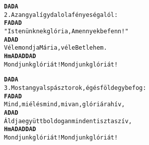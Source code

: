 \newpage
{}
\kottastart
{}
\kottaend
\begin{minipage}{\textwidth}
\begin{alltt}
\textbf{      D             A     D          A}
2. Az angyal így dalol a fényes ég alól:
\textbf{    F    A        D            A           D}
   "Istenünknek glória, A mennyekbe fenn!"
\textbf{    A           D              A    D}
   Véle mondja Mária, véle Betlehem.
\textbf{    Hm        A  D A  D    D    A  D}
   Mondjunk glóriát! Mondjunk glóriát!
\end{alltt}
\vspace{0.0cm}
\versszakspacing
\end{minipage}
\begin{minipage}{\textwidth}
\begin{alltt}
\textbf{        D                      A   D            A}
3. Most angyal s pásztorok, ég és föld egybefog:
\textbf{    F          A       D                  A   D}
   Mind, mi él és mind, mi van, glóriára hív,
\textbf{   A             D               A          D}
   Áldja együtt boldogan minden tiszta szív,
\textbf{    Hm        A  D A  D    D    A  D}
   Mondjunk glóriát! Mondjunk glóriát!
\end{alltt}
\vspace{0.0cm}
\versszakspacing
\end{minipage}
